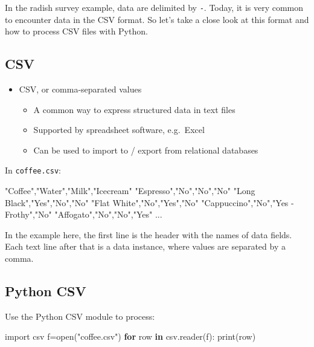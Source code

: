 \documentclass[
  letterpaper,
]{scrbook}
\newenvironment{Shaded}{\begin{snugshade}}{\end{snugshade}}
\newcommand{\BuiltInTok}[1]{\textcolor[rgb]{0.00,0.23,0.31}{#1}}
\newcommand{\ControlFlowTok}[1]{\textcolor[rgb]{0.00,0.23,0.31}{\textbf{#1}}}
\newcommand{\ImportTok}[1]{\textcolor[rgb]{0.00,0.46,0.62}{#1}}
\newcommand{\KeywordTok}[1]{\textcolor[rgb]{0.00,0.23,0.31}{\textbf{#1}}}
\newcommand{\NormalTok}[1]{\textcolor[rgb]{0.00,0.23,0.31}{#1}}
\newcommand{\OperatorTok}[1]{\textcolor[rgb]{0.37,0.37,0.37}{#1}}
\newcommand{\StringTok}[1]{\textcolor[rgb]{0.13,0.47,0.30}{#1}}
\providecommand{\tightlist}{%
  \setlength{\itemsep}{0pt}\setlength{\parskip}{0pt}}
\begin{document}

In the radish survey example, data are delimited by \texttt{-}. Today,
it is very common to encounter data in the CSV format. So let's take a
close look at this format and how to process CSV files with Python.

\subsection*{CSV}\label{csv}

\begin{itemize}
\tightlist
\item
  CSV, or comma-separated values

  \begin{itemize}
  \tightlist
  \item
    A common way to express structured data in text files
  \item
    Supported by spreadsheet software, e.g.~Excel
  \item
    Can be used to import to / export from relational databases
  \end{itemize}
\end{itemize}

In \texttt{coffee.csv}:

\begin{Shaded}
\begin{Highlighting}[]
\NormalTok{"Coffee","Water","Milk","Icecream"}
\NormalTok{"Espresso","No","No","No"}
\NormalTok{"Long Black","Yes","No","No"}
\NormalTok{"Flat White","No","Yes","No"}
\NormalTok{"Cappuccino","No","Yes {-} Frothy","No"}
\NormalTok{"Affogato","No","No","Yes"}
\NormalTok{...}
\end{Highlighting}
\end{Shaded}

In the example here, the first line is the header with the names of data
fields. Each text line after that is a data instance, where values are
separated by a comma.

\subsection*{Python CSV}\label{python-csv}

Use the Python CSV module to process:

\begin{Shaded}
\begin{Highlighting}[]
\ImportTok{import}\NormalTok{ csv}
\NormalTok{f}\OperatorTok{=}\BuiltInTok{open}\NormalTok{(}\StringTok{"coffee.csv"}\NormalTok{)}
\ControlFlowTok{for}\NormalTok{ row }\KeywordTok{in}\NormalTok{ csv.reader(f):}
    \BuiltInTok{print}\NormalTok{(row)}
\end{Highlighting}
\end{Shaded}
\end{document}
